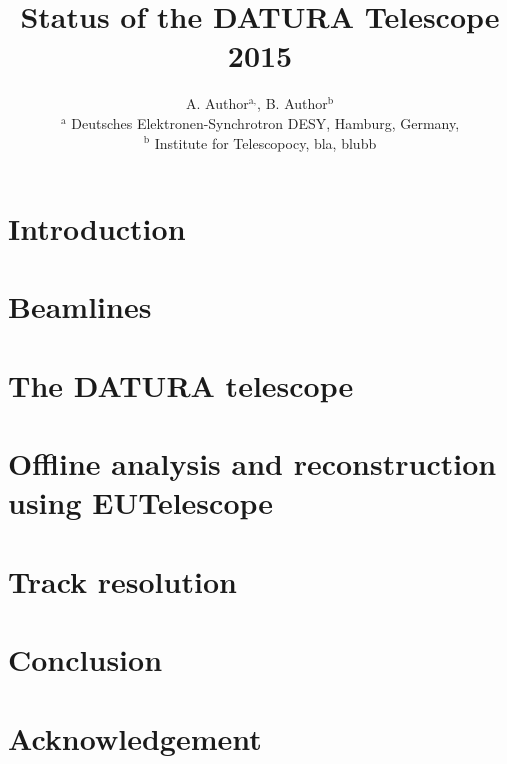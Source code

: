 \documentclass{JINST}
\title{Status of the DATURA Telescope 2015}
\author{A. Author${}^{\textrm{a},}$, B. Author${}^{\textrm{b}}$\\
${}^{\textrm{a}}$ Deutsches Elektronen-Synchrotron DESY, Hamburg, Germany,\\
${}^{\textrm{b}}$ Institute for Telescopocy, bla, blubb
}
\begin{document}
 \setpagewiselinenumbers
\modulolinenumbers[5]
\linenumbers

\normalsize

\section{Introduction}
\label{sec:intro}


\section{Beamlines}
\label{sec:beamlines}


\section{The DATURA telescope}
\label{sec:aida}


\section{Offline analysis and reconstruction using EUTelescope}
\label{sec:offline}


\section{Track resolution}
\label{sec:trackres}


\section{Conclusion}

\section*{Acknowledgement}

\small


\end{document}
